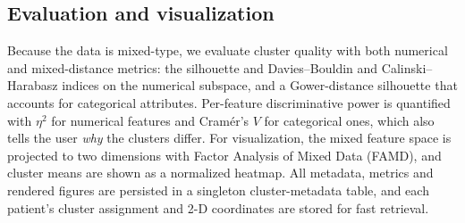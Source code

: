 \subsection{Evaluation and visualization}
Because the data is mixed-type, we evaluate cluster quality with both numerical
and mixed-distance metrics: the silhouette and Davies--Bouldin and
Calinski--Harabasz indices on the numerical subspace, and a Gower-distance
silhouette that accounts for categorical attributes. Per-feature discriminative
power is quantified with $\eta^2$ for numerical features and Cram\'er's $V$ for
categorical ones, which also tells the user \emph{why} the clusters differ. For
visualization, the mixed feature space is projected to two dimensions with
Factor Analysis of Mixed Data (FAMD), and cluster means are shown as a
normalized heatmap. All metadata, metrics and rendered figures are persisted in
a singleton cluster-metadata table, and each patient's cluster assignment and
2-D coordinates are stored for fast retrieval.
